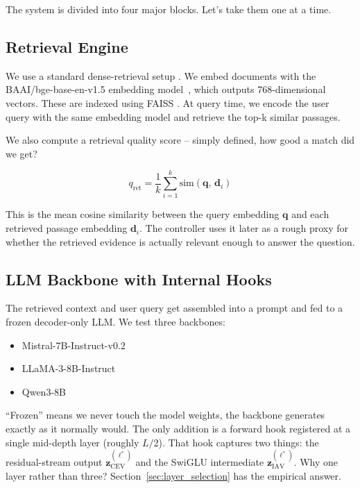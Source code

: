 The system is divided into four major blocks. Let's take them one at a time.
\newpage
\subsection{Retrieval Engine}
\label{subsec:retrieval_engine}

We use a standard dense-retrieval setup \cite{karpukhin2020dpr}. We embed documents with the BAAI/bge-base-en-v1.5 embedding model~\cite{xiao2023bge}, which outputs 768-dimensional vectors. These are indexed using FAISS \cite{johnson2019faiss}. At query time, we encode the user query with the same embedding model and retrieve the top-k similar passages.

We also compute a retrieval quality score -- simply defined, how good a match did we get?

\begin{equation}
    q_{\text{ret}} = \frac{1}{k} \sum_{i=1}^{k} \text{sim}(\mathbf{q},\, \mathbf{d}_i)
    \label{eq:qret}
\end{equation}

\noindent This is the mean cosine similarity between the query embedding $\mathbf{q}$ and each retrieved passage embedding $\mathbf{d}_i$. The controller uses it later as a rough proxy for whether the retrieved evidence is actually relevant enough to answer the question.

\subsection{LLM Backbone with Internal Hooks}
\label{subsec:llm_backbone}

The retrieved context and user query get assembled into a prompt and fed to a frozen decoder-only LLM. We test three backbones:
\begin{itemize}
    \item Mistral-7B-Instruct-v0.2
    \item LLaMA-3-8B-Instruct
    \item Qwen3-8B
\end{itemize}

``Frozen'' means we never touch the model weights, the backbone generates exactly as it normally would. The only addition is a forward hook registered at a single mid-depth layer (roughly $L/2$). That hook captures two things: the residual-stream output $\mathbf{z}_{\text{CEV}}^{(\ell^*)}$ and the SwiGLU intermediate $\mathbf{z}_{\text{IAV}}^{(\ell^*)}$. Why one layer rather than three? Section~\ref{sec:layer_selection} has the empirical answer.

